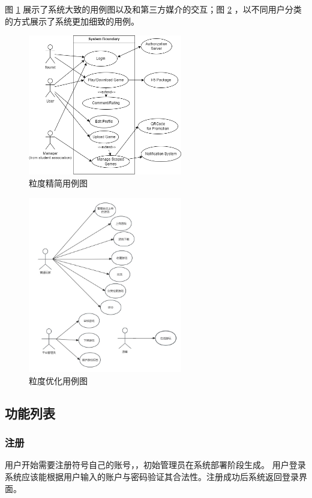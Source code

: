 \documentclass[12pt]{ctexart} %
\begin{document}
图 \ref{fig:all-use-case-brief} 展示了系统大致的用例图以及和第三方媒介的交互；图 \ref{fig:all-use-case-unorg} ，以不同用户分类的方式展示了系统更加细致的用例。

\begin{figure}[htbp]
  \centering
  \includegraphics[width=0.6\textwidth]{all_use_case.png}
  \caption{粒度精简用例图}
  \label{fig:all-use-case-brief}
\end{figure}

\begin{figure}[htbp]
  \centering
  \includegraphics[width=0.6\textwidth]{yongli.jpg}
  \caption{粒度优化用例图}
  \label{fig:all-use-case-unorg}
\end{figure}

\subsection{功能列表}
\subsubsection{注册}
用户开始需要注册符号自己的账号，，初始管理员在系统部署阶段生成。
用户登录系统应该能根据用户输入的账户与密码验证其合法性。注册成功后系统返回登录界面。
\end{document}
